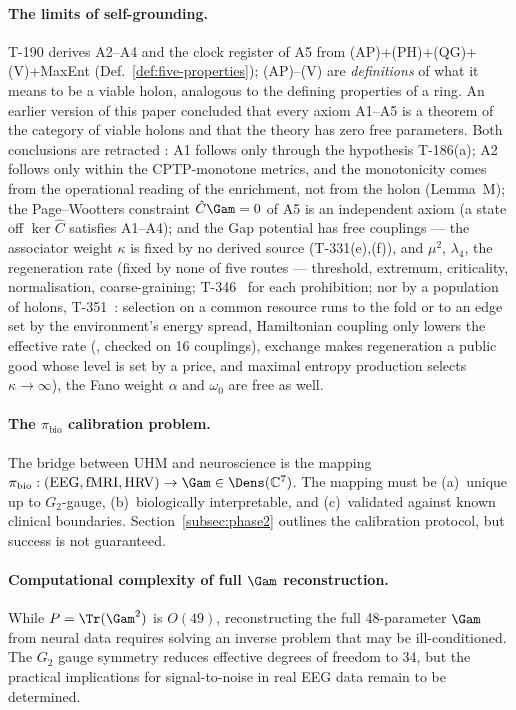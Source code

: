 \paragraph{The limits of self-grounding.}
T-190 derives A2--A4 and the clock register of A5 from (AP)\allowbreak+(PH)\allowbreak+(QG)\allowbreak+(V)\allowbreak+MaxEnt
(Def.~\ref{def:five-properties}); (AP)--(V) are \emph{definitions} of what it
means to be a viable holon, analogous to the defining properties of a ring.
An earlier version of this paper concluded that every axiom A1--A5 is a
theorem of the category of viable holons and that the theory has zero free
parameters. Both conclusions are retracted \status{$\times$}: A1 follows only
through the hypothesis T-186(a); A2 follows only within the CPTP-monotone
metrics, and the monotonicity comes from the operational reading of the
enrichment, not from the holon (Lemma~M); the Page--Wootters constraint $\hat C\Gam = 0$
of A5 is an independent axiom (a state off $\ker\hat C$ satisfies A1--A4); and
the Gap potential has free couplings --- the associator weight $\kappa$ is fixed
by no derived source (T-331(e),(f)), and $\mu^2$, $\lambda_4$, the regeneration
rate (fixed by none of five routes --- threshold, extremum, criticality,
normalisation, coarse-graining; T-346~ for each prohibition; nor by a
population of holons, T-351~: selection on a common resource runs to the
fold or to an edge set by the environment's energy spread, Hamiltonian coupling only
lowers the effective rate (, checked on 16 couplings), exchange makes
regeneration a public good whose level is set by a price, and maximal entropy
production selects $\kappa \to \infty$), the Fano
weight $\alpha$ and $\omega_0$ are free as well.

\paragraph{The $\pi_{\mathrm{bio}}$ calibration problem.}
The bridge between UHM and neuroscience is the mapping
$\pi_{\mathrm{bio}}: (\mathrm{EEG}, \mathrm{fMRI}, \mathrm{HRV}) \to \Gam \in
\Dens(\mathbb{C}^7)$. The mapping must be (a)~unique up to $G_2$-gauge, (b)~biologically
interpretable, and (c)~validated against known clinical boundaries.
Section~\ref{subsec:phase2} outlines the calibration protocol, but success is not
guaranteed.

\paragraph{Computational complexity of full $\Gam$ reconstruction.}
While $P = \Tr(\Gam^2)$ is $O(49)$, reconstructing the full 48-parameter $\Gam$ from
neural data requires solving an inverse problem that may be ill-conditioned. The $G_2$
gauge symmetry reduces effective degrees of freedom to 34, but the practical implications
for signal-to-noise in real EEG data remain to be determined.

